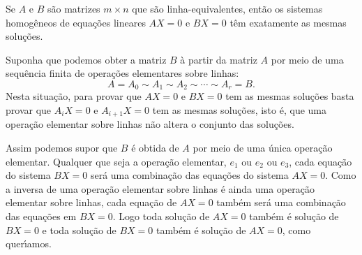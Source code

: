 \begin{teorema}
	Se $A$ e $B$ s\~ao matrizes $m \times n$ que s\~ao linha-equivalentes, ent\~ao os sistemas homog\^eneos de equa\c{c}\~oes lineares $AX = 0$ e $BX = 0$ t\^em exatamente as mesmas solu\c{c}\~oes.
\end{teorema}
\begin{prova}
	Suponha que podemos obter a matriz $B$ \`a partir da matriz $A$ por meio de uma sequ\^encia finita de opera\c{c}\~oes elementares sobre linhas:
	\[
	A = A_0 \sim A_1 \sim A_2 \sim \cdots \sim A_r = B.
	\]
	Nesta situa\c{c}\~ao, para provar que $AX = 0$ e $BX = 0$ tem as mesmas solu\c{c}\~oes basta provar que $A_iX = 0$ e $A_{i + 1}X = 0$ tem as mesmas solu\c{c}\~oes, isto \'e, que uma opera\c{c}\~ao elementar sobre linhas n\~ao altera o conjunto das solu\c{c}\~oes.

	Assim podemos supor que $B$ \'e obtida de $A$ por meio de uma \'unica opera\c{c}\~ao elementar. Qualquer que seja a opera\c{c}\~ao elementar, $e_1$ ou $e_2$ ou $e_3$, cada equa\c{c}\~ao do sistema $BX = 0$ ser\'a uma combina\c{c}\~ao das equa\c{c}\~oes do sistema $AX = 0$. Como a inversa de uma opera\c{c}\~ao elementar sobre linhas \'e ainda uma opera\c{c}\~ao elementar sobre linhas, cada equa\c{c}\~ao de $AX = 0$ tamb\'em ser\'a uma combina\c{c}\~ao das equa\c{c}\~oes em $BX = 0$. Logo toda solu\c{c}\~ao de $AX = 0$ tamb\'em \'e solu\c{c}\~ao de $BX = 0$ e toda solu\c{c}\~ao de $BX = 0$ tamb\'em \'e solu\c{c}\~ao de $AX = 0$, como quer{\'\i}amos.
\end{prova}


